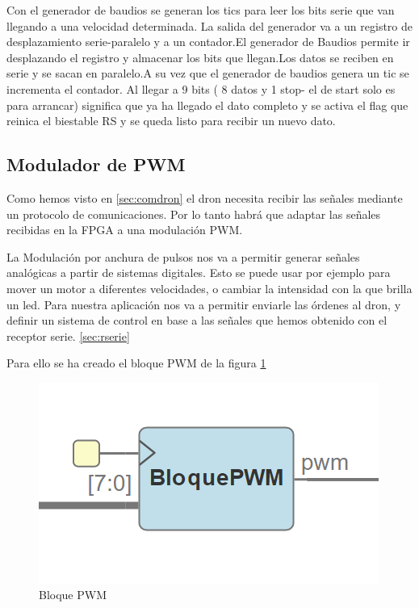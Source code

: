 Con el generador de baudios se generan los tics para leer los bits serie que van llegando a una velocidad determinada. La salida del generador va a un registro de desplazamiento serie-paralelo y a un contador.El generador de Baudios permite ir desplazando el registro y almacenar los bits que llegan.Los datos se reciben en serie y se sacan en paralelo.A su vez que el generador de baudios genera un tic se incrementa el contador. Al llegar a 9 bits ( 8 datos y 1 stop- el de start solo es para arrancar) significa que ya ha llegado el dato completo y se  activa el flag que reinica el biestable RS y se queda listo para recibir un nuevo dato.
\subsection{Modulador de PWM}

Como hemos visto en \ref{sec:comdron} el dron necesita recibir las señales mediante un protocolo de comunicaciones. Por lo tanto habrá que adaptar las señales recibidas en la FPGA a una modulación PWM. \newline

La Modulación por anchura de pulsos nos va a permitir generar señales analógicas a partir de sistemas digitales.  Esto se puede usar por ejemplo para mover un motor a diferentes velocidades, o cambiar la intensidad con la que brilla un led. Para nuestra aplicación nos va a permitir enviarle las órdenes al dron, y definir un sistema de control en base a las señales que hemos obtenido con el receptor serie. \ref{sec:rserie}

Para ello se ha creado el bloque PWM de la figura \ref{fig:bloquepwm}

\begin{figure}[H]
	\center
	\includegraphics[scale=0.7]{imagenes/Disenodelsistema/bloquePWM.png}
	\caption{Bloque PWM}
	\label{fig:bloquepwm}
\end{figure}

